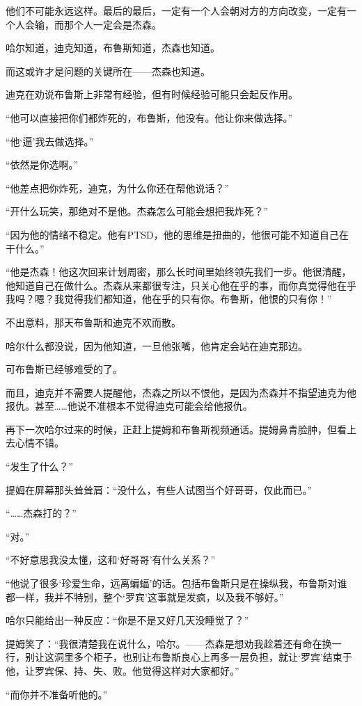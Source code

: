 \documentclass[../main]{subfiles}
\begin{document}
他们不可能永远这样。最后的最后，一定有一个人会朝对方的方向改变，一定有一个人会输，而那个人一定会是杰森。

哈尔知道，迪克知道，布鲁斯知道，杰森也知道。

而这或许才是问题的关键所在——杰森也知道。

迪克在劝说布鲁斯上非常有经验，但有时候经验可能只会起反作用。

“他可以直接把你们都炸死的，布鲁斯，他没有。他让你来做选择。”

“他`逼'我去做选择。”

“依然是你选啊。”

“他差点把你炸死，迪克，为什么你还在帮他说话？”

“开什么玩笑，那绝对不是他。杰森怎么可能会想把我炸死？”

“因为他的情绪不稳定。他有PTSD，他的思维是扭曲的，他很可能不知道自己在干什么。”

“他是杰森！他这次回来计划周密，那么长时间里始终领先我们一步。他很清醒，他知道自己在做什么。杰森从来都很专注，只关心他在乎的事，而你真觉得他在乎我吗？嗯？我觉得我们都知道，他在乎的只有你。布鲁斯，他恨的只有你！”

不出意料，那天布鲁斯和迪克不欢而散。

哈尔什么都没说，因为他知道，一旦他张嘴，他肯定会站在迪克那边。

可布鲁斯已经够难受的了。

而且，迪克并不需要人提醒他，杰森之所以不恨他，是因为杰森并不指望迪克为他报仇。甚至……他说不准根本不觉得迪克可能会给他报仇。

再下一次哈尔过来的时候，正赶上提姆和布鲁斯视频通话。提姆鼻青脸肿，但看上去心情不错。

“发生了什么？”

提姆在屏幕那头耸耸肩：“没什么，有些人试图当个好哥哥，仅此而已。”

“……杰森打的？”

“对。”

“不好意思我没太懂，这和`好哥哥'有什么关系？”

“他说了很多`珍爱生命，远离蝙蝠'的话。包括布鲁斯只是在操纵我，布鲁斯对谁都一样，我并不特别，整个`罗宾'这事就是发疯，以及我不够好。”

哈尔只能给出一种反应：“你是不是又好几天没睡觉了？”

提姆笑了：“我很清楚我在说什么，哈尔。——杰森是想劝我趁着还有命在换一行，别让这洞里多个柜子，也别让布鲁斯良心上再多一层负担，就让`罗宾'结束于他，让罗宾保、持、失、败。他觉得这样对大家都好。”

“而你并不准备听他的。”
\end{document}
